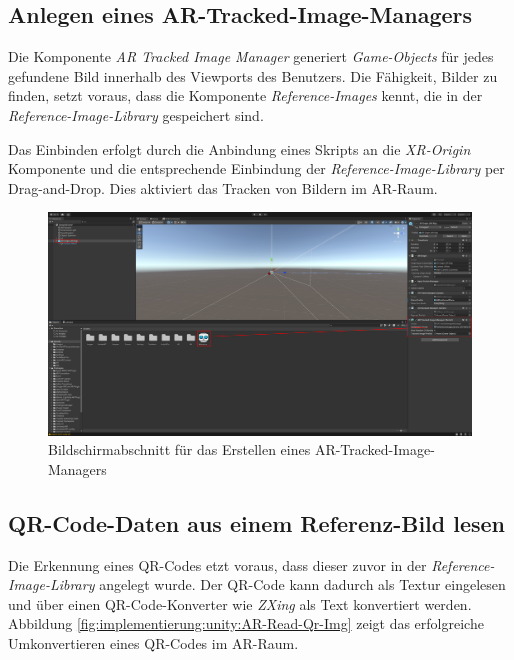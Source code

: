 \subsection{Anlegen eines AR-Tracked-Image-Managers}

Die Komponente \textit{AR Tracked Image Manager} generiert \textit{Game-Objects} für jedes gefundene Bild innerhalb des Viewports des Benutzers. Die Fähigkeit, Bilder zu finden, setzt voraus, dass die Komponente \textit{Reference-Images} kennt, die in der \textit{Reference-Image-Library} gespeichert sind.

Das Einbinden erfolgt durch die Anbindung eines Skripts an die \textit{XR-Origin} Komponente und die entsprechende Einbindung der \textit{Reference-Image-Library} per Drag-and-Drop. Dies aktiviert das Tracken von Bildern im AR-Raum.

\begin{figure}[H]
    \centering
    \includegraphics[width=\textwidth]{images/PrAr_UnityAR-Create-Img-Mngr.png}
    \caption{Bildschirmabschnitt für das Erstellen eines AR-Tracked-Image-Managers}
    \label{fig:implementierung:unity:AR-Create-Img-Mngr}
\end{figure}

\subsection{QR-Code-Daten aus einem Referenz-Bild lesen}

Die Erkennung eines QR-Codes etzt voraus, dass dieser zuvor in der \textit{Reference-Image-Library} angelegt wurde. Der QR-Code kann dadurch als Textur eingelesen und über einen QR-Code-Konverter wie \textit{ZXing} als Text konvertiert werden. Abbildung \ref{fig:implementierung:unity:AR-Read-Qr-Img} zeigt das erfolgreiche Umkonvertieren eines QR-Codes im AR-Raum.

